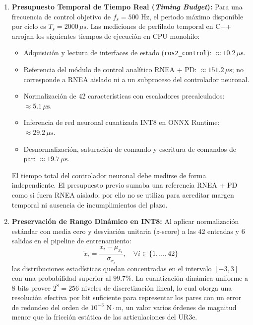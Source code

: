 \documentclass[12pt]{article}
\begin{document}
\begin{enumerate}
    \item \textbf{Presupuesto Temporal de Tiempo Real (\textit{Timing Budget}):}
    Para una frecuencia de control objetivo de $f_s = 500\text{ Hz}$, el periodo máximo disponible por ciclo es $T_s = 2000\,\mu\text{s}$. Las mediciones de perfilado temporal en C++ arrojan los siguientes tiempos de ejecución en CPU monohilo:
    \begin{itemize}
        \item Adquisición y lectura de interfaces de estado (\texttt{ros2\_control}): $\approx 10.2\,\mu\text{s}$.
        \item Referencia del módulo de control analítico RNEA + PD: $\approx 151.2\,\mu\text{s}$; no corresponde a RNEA aislado ni a un subproceso del controlador neuronal.
        \item Normalización de 42 características con escaladores precalculados: $\approx 5.1\,\mu\text{s}$.
        \item Inferencia de red neuronal cuantizada INT8 en ONNX Runtime: $\approx 29.2\,\mu\text{s}$.
        \item Desnormalización, saturación de comando y escritura de comandos de par: $\approx 19.7\,\mu\text{s}$.
    \end{itemize}
    El tiempo total del controlador neuronal debe medirse de forma independiente. El presupuesto previo sumaba una referencia RNEA + PD como si fuera RNEA aislado; por ello no se utiliza para acreditar margen temporal ni ausencia de incumplimientos del plazo.

    \item \textbf{Preservación de Rango Dinámico en INT8:}
    Al aplicar normalización estándar con media cero y desviación unitaria ($z$-score) a las 42 entradas y 6 salidas en el pipeline de entrenamiento:
    \begin{equation}
        \tilde{x}_i = \frac{x_i - \mu_{x_i}}{\sigma_{x_i}}, \quad \forall i \in \{1,\dots,42\}
    \end{equation}
    las distribuciones estadísticas quedan concentradas en el intervalo $[-3, 3]$ con una probabilidad superior al $99.7\%$. La cuantización dinámica uniforme a 8 bits provee $2^8 = 256$ niveles de discretización lineal, lo cual otorga una resolución efectiva por bit suficiente para representar los pares con un error de redondeo del orden de $10^{-3}\text{ N}\cdot\text{m}$, un valor varios órdenes de magnitud menor que la fricción estática de las articulaciones del UR3e.
\end{enumerate}
\end{document}
